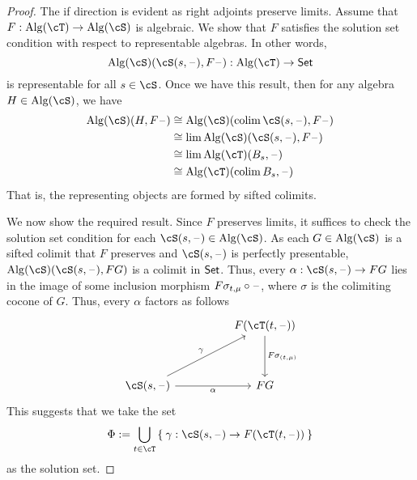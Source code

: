 \documentclass{zett}
\begin{document}
\begin{proof}
  The if direction is evident as right adjoints preserve limits.
  Assume that $F : \Alg(\cT) \to \Alg(\cS)$ is algebraic.
  We show that $F$ satisfies the solution set condition with respect to representable algebras.
  In other words,
  \[
    \Alg(\cS)(\cS(s,\blank),F\blank) : \Alg(\cT) \to \CSet
  \]
  is representable for all $s \in \cS$.
  Once we have this result, then for any algebra $H \in \Alg(\cS)$, we have
  \begin{align}
    \Alg(\cS)(H, F\blank) &\iso \Alg(\cS)(\colim \cS(s, \blank), F\blank)\\
                          &\iso \lim\Alg(\cS)(\cS(s, \blank), F\blank)\\
                          &\iso \lim\Alg(\cT)(B_{s}, \blank)\\
                          &\iso \Alg(\cT)(\colim B_{s}, \blank)
  \end{align}
  That is, the representing objects are formed by sifted colimits.

  We now show the required result.
  Since $F$ preserves limits, it suffices to check the solution set condition for each $\cS(s,\blank) \in \Alg(\cS)$.
  As each $G \in \Alg(\cS)$ is a sifted colimit that $F$ preserves and $\cS(s,\blank)$ is perfectly presentable, $\Alg(\cS)(\cS(s,\blank),FG)$ is a colimit in $\mathsf{Set}$.
  Thus, every $\alpha : \cS(s,\blank) \to FG$ lies in the image of some inclusion morphism $F\sigma_{t,\mu} \circ \mathord{\hspace{1pt}\text{--}\hspace{1pt}}$, where $\sigma$ is the colimiting cocone of $G$.
  Thus, every $\alpha$ factors as follows
  \[\begin{tikzcd}
      && {F(\cT(t,\blank))} \\
      \\
      {\cS(s,\blank)} && FG
      \arrow["\alpha"', from=3-1, to=3-3]
      \arrow["{F\sigma_{(t,\mu)}}", from=1-3, to=3-3]
      \arrow["\gamma", from=3-1, to=1-3]
    \end{tikzcd}\]
  This suggests that we take the set
  \[
    \Phi := \bigcup_{t \in \cT}\Set{\gamma : \cS(s,\blank) \to F(\cT(t,\blank))}
  \]
  as the solution set.
\end{proof}
\end{document}
